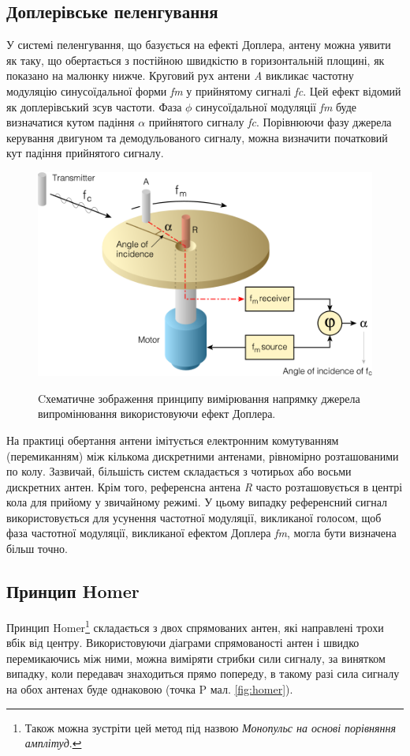\documentclass{article}
\begin{document}
\subsection{Доплерівське пеленгування}
У системі пеленгування, що базується на ефекті Доплера, антену можна уявити як таку, що обертається з постійною швидкістю в горизонтальній площині, як показано на малюнку нижче. Круговий рух антени \textit{A} викликає частотну модуляцію синусоїдальної форми \textit{fm} у прийнятому сигналі \textit{fc}. Цей ефект відомий як доплерівський зсув частоти. Фаза $\phi$ синусоїдальної модуляції \textit{fm} буде визначатися кутом падіння $\alpha$ прийнятого сигналу \textit{fc}. Порівнюючи фазу джерела керування двигуном та демодульованого сигналу, можна визначити початковий кут падіння прийнятого сигналу.

\begin{figure}[H]
\centering
{\includegraphics[width=0.6\linewidth]{images/rdf-dopler.png}}
\caption{\label{fig:rdf:dopler}Cхематичне зображення принципу вимірювання напрямку джерела випромінювання використовуючи ефект Доплера.}
\end{figure}

На практиці обертання антени імітується електронним комутуванням (перемиканням) між кількома дискретними антенами, рівномірно розташованими по колу. Зазвичай, більшість систем складається з чотирьох або восьми дискретних антен. Крім того, референсна антена \textit{R} часто розташовується в центрі кола для прийому у звичайному режимі. У цьому випадку референсний сигнал використовується для усунення частотної модуляції, викликаної голосом, щоб фаза частотної модуляції, викликаної ефектом Доплера \textit{fm}, могла бути визначена більш точно.

\subsection{Принцип Homer}

Принцип Homer\footnote{Також можна зустріти цей метод під назвою \textit{Монопульс на основі порівняння амплітуд}.} складається з двох спрямованих антен, які направлені трохи вбік від центру. Використовуючи діаграми спрямованості антен і швидко перемикаючись між ними, можна виміряти стрибки сили сигналу, за винятком випадку, коли передавач знаходиться прямо попереду, в такому разі сила сигналу на обох антенах буде однаковою (точка P мал. \ref{fig:homer}).
\end{document}
